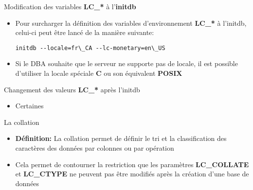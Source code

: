 
\begin{frame}[fragile]{Modification des variables \textbf{LC\_*} à l'\textbf{initdb}}

\begin{itemize}
   \item Pour surcharger la définition des variables d'environnement \textbf{LC\_*} à l'initdb, celui-ci peut être lancé de la manière suivante:
\begin{tiny}
\begin{Verbatim}[commandchars=\&\{\}]
initdb --locale=fr\_CA --lc-monetary=en\_US
\end{Verbatim}
\end{tiny}
   \item Si le DBA souhaite que le serveur ne supporte pas de locale, il est possible d'utiliser la locale spéciale \textbf{C} ou son équivalent \textbf{POSIX}
\end{itemize}

\end{frame}


\begin{frame}[fragile]{Changement des valeurs \textbf{LC\_*} après l'initdb}

\begin{itemize}
   \item Certaines 
\end{itemize}

\end{frame}


\begin{frame}[fragile]{La collation}

\begin{itemize}
   \item \textbf{Définition:} La collation permet de définir le tri et la classification des caractères des données par colonnes ou par opération
   \item Cela permet de contourner la restriction que les paramètres \textbf{LC\_COLLATE} et \textbf{LC\_CTYPE} ne peuvent pas être modifiés après la création d'une base de données
\end{itemize}

\begin{toile}
\end{toile}

\end{frame}

